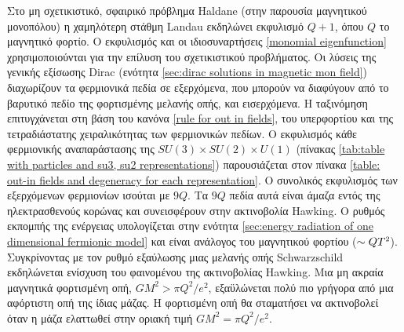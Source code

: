 Στο μη σχετικιστικό, σφαιρικό πρόβλημα Haldane (στην παρουσία μαγνητικού μονοπόλου) η χαμηλότερη στάθμη Landau εκδηλώνει
εκφυλισμό $Q+1$, όπου $Q$ το μαγνητικό φορτίο. Ο εκφυλισμός και οι ιδιοσυναρτήσεις \eqref{monomial eigenfunction} χρησιμοποιούνται για την επίλυση του σχετικιστικού προβλήματος. Οι λύσεις της γενικής εξίσωσης Dirac (ενότητα \ref{sec:dirac solutions in magnetic mon field}) διαχωρίζουν τα φερμιονικά πεδία σε εξερχόμενα, που μπορούν να διαφύγουν από το βαρυτικό πεδίο της φορτισμένης μελανής οπής, και εισερχόμενα. Η ταξινόμηση επιτυγχάνεται στη βάση του κανόνα \eqref{rule for out in fields}, του υπερφορτίου και της τετραδιάστατης χειραλικότητας των φερμιονικών πεδίων.
Ο εκφυλισμός κάθε φερμιονικής αναπαράστασης της $SU(3)\times SU(2)\times U(1)$ (πίνακας \ref{tab:table with particles and su3, su2 representations}) παρουσιάζεται στον πίνακα \ref{table: out-in fields and degeneracy for each representation}. Ο συνολικός εκφυλισμός των εξερχόμενων φερμιονίων ισούται με $9Q$.
Τα $9Q$ πεδία αυτά είναι άμαζα εντός της ηλεκτρασθενούς κορώνας και συνεισφέρουν στην ακτινοβολία Hawking. Ο ρυθμός εκπομπής της ενέργειας 
υπολογίζεται στην ενότητα \ref{sec:energy radiation of one dimensional fermionic model} και είναι ανάλογος του μαγνητικού φορτίου ($\sim QT\superscr{2}$). Συγκρίνοντας με τον ρυθμό εξαύλωσης μιας μελανής οπής Schwarzschild 
εκδηλώνεται ενίσχυση του φαινομένου της ακτινοβολίας Hawking. Μια μη ακραία μαγνητικά φορτισμένη οπή, $GM^2 > \pi Q^2/e^2$, εξαϋλώνεται πολύ πιο γρήγορα 
από μια αφόρτιστη οπή της ίδιας μάζας. Η φορτισμένη οπή θα σταματήσει να ακτινοβολεί όταν η μάζα ελαττωθεί στην οριακή τιμή $GM^2 = \pi Q^2/e^2$.